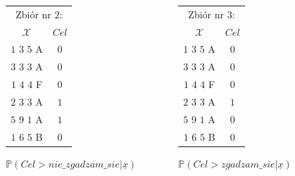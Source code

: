 \documentclass[11pt,usenames,dvipsnames,svgnames,x11names]{beamer}
\theoremstyle{plain}
\theoremstyle{definition}
\theoremstyle{remark}
\begin{document}
\begin{frame}
\begin{columns}
\begin{column}[t]{0.3\textwidth}
	\end{column}

	\begin{column}[t]{0.3\textwidth}
		\centering

		\begin{tabular}{c|c} 
			\multicolumn{2}{c}{\textrm{Zbiór nr $2$:}}\\ 
			$\mathcal{X}$ & $Cel$ \\
			\hline
			$1$ $3$ $5$ A & $0$\\
			$3$ $3$ $3$ A & $0$\\
			$1$ $4$ $4$ F & $0$\\
			$2$ $3$ $3$ A & $1$\\
			$5$ $9$ $1$ A & $1$\\
			$1$ $6$ $5$ B & $0$
		\end{tabular}
		
		
		
		\begin{center}
			\mbox{$\mathbb{P}(Cel > nie\_zgadzam\_sie|\underline{x})$}
		\end{center}
		
		
	\end{column}
	
	\begin{column}[t]{0.3\textwidth}
		\centering
		
		\begin{tabular}{c|c} 
			\multicolumn{2}{c}{\textrm{Zbiór nr $3$:}}\\ 
			$\mathcal{X}$ & $Cel$ \\
			\hline
			$1$ $3$ $5$ A & $0$\\
			$3$ $3$ $3$ A & $0$\\
			$1$ $4$ $4$ F & $0$\\
			$2$ $3$ $3$ A & $1$\\
			$5$ $9$ $1$ A & $0$\\
			$1$ $6$ $5$ B & $0$
		\end{tabular}
		
		
		
		\begin{center}
			
			\mbox{$\mathbb{P}(Cel > zgadzam\_sie|\underline{x})$}
		\end{center}
		
	\end{column}
\end{columns}
\end{frame}
\end{document}
